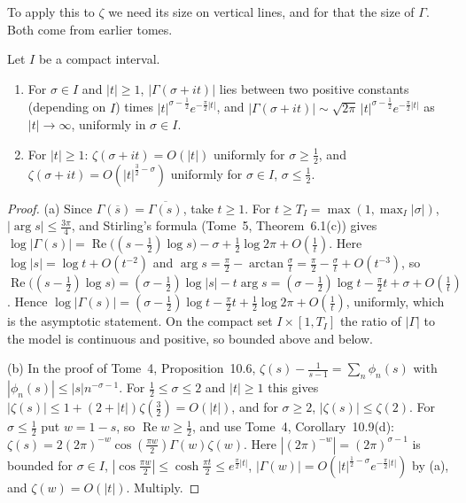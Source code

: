 To apply this to $\zeta$ we need its size on vertical lines, and for that the size of $\Gamma$. Both come from earlier tomes.

\begin{lemma}\label{lem:verticalsizes}
Let $I$ be a compact interval.
\begin{enumerate}
\item[(a)] For $\sigma\in I$ and $|t|\ge1$, $|\Gamma(\sigma+it)|$ lies between two positive constants (depending on $I$) times $|t|^{\sigma-\frac12}e^{-\frac\pi2|t|}$, and
$|\Gamma(\sigma+it)|\sim\sqrt{2\pi}\,|t|^{\sigma-\frac12}e^{-\frac\pi2|t|}$ as $|t|\to\infty$, uniformly in $\sigma\in I$.
\item[(b)] For $|t|\ge1$: $\zeta(\sigma+it)=O(|t|)$ uniformly for $\sigma\ge\frac12$, and $\zeta(\sigma+it)=O(|t|^{\frac32-\sigma})$ uniformly for $\sigma\in I$, $\sigma\le\frac12$.
\end{enumerate}
\end{lemma}
\begin{proof}
(a) Since $\Gamma(\overline s)=\overline{\Gamma(s)}$, take $t\ge1$. For $t\ge T_I=\max(1,\max_I|\sigma|)$, $|\arg s|\le\frac{3\pi}4$, and Stirling's formula (Tome~5, Theorem~6.1(c)) gives
$\log|\Gamma(s)|=\operatorname{Re}\bigl((s-\frac12)\log s\bigr)-\sigma+\frac12\log2\pi+O(\frac1t)$. Here $\log|s|=\log t+O(t^{-2})$ and $\arg s=\frac\pi2-\arctan\frac\sigma t=\frac\pi2-\frac\sigma t+O(t^{-3})$, so
$\operatorname{Re}\bigl((s-\frac12)\log s\bigr)=(\sigma-\frac12)\log|s|-t\arg s=(\sigma-\frac12)\log t-\frac\pi2t+\sigma+O(\frac1t)$. Hence $\log|\Gamma(s)|=(\sigma-\frac12)\log t-\frac\pi2t+\frac12\log2\pi+O(\frac1t)$,
uniformly, which is the asymptotic statement. On the compact set $I\times[1,T_I]$ the ratio of $|\Gamma|$ to the model is continuous and positive, so bounded above and below.

(b) In the proof of Tome~4, Proposition~10.6, $\zeta(s)-\frac1{s-1}=\sum_n\phi_n(s)$ with $|\phi_n(s)|\le|s|n^{-\sigma-1}$. For $\frac12\le\sigma\le2$ and $|t|\ge1$ this gives $|\zeta(s)|\le1+(2+|t|)\zeta(\frac32)=O(|t|)$, and
for $\sigma\ge2$, $|\zeta(s)|\le\zeta(2)$. For $\sigma\le\frac12$ put $w=1-s$, so $\operatorname{Re}w\ge\frac12$, and use Tome~4, Corollary~10.9(d):
$\zeta(s)=2(2\pi)^{-w}\cos(\frac{\pi w}2)\Gamma(w)\zeta(w)$. Here $|(2\pi)^{-w}|=(2\pi)^{\sigma-1}$ is bounded for $\sigma\in I$, $|\cos\frac{\pi w}2|\le\cosh\frac{\pi t}2\le e^{\frac\pi2|t|}$, $|\Gamma(w)|=O(|t|^{\frac12-\sigma}e^{-\frac\pi2|t|})$
by (a), and $\zeta(w)=O(|t|)$. Multiply.
\end{proof}

